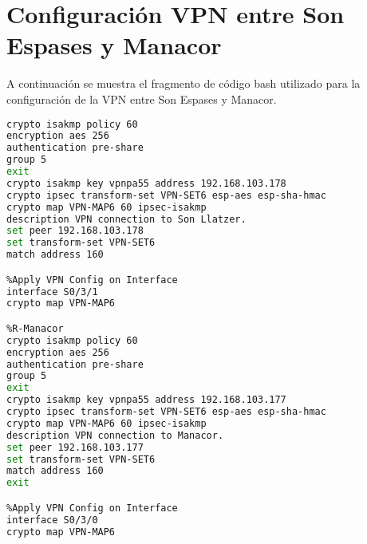 \section{Configuración VPN entre Son Espases y Manacor}\label{anexo:vpn}
A continuación se muestra el fragmento de código bash utilizado para la configuración de la VPN entre Son Espases y Manacor.

\begin{lstlisting}[language=Bash, caption={Configuración VPN entre Son Espases y Manacor}]
%R-Son_Espases
crypto isakmp policy 60
encryption aes 256
authentication pre-share
group 5
exit
crypto isakmp key vpnpa55 address 192.168.103.178
crypto ipsec transform-set VPN-SET6 esp-aes esp-sha-hmac
crypto map VPN-MAP6 60 ipsec-isakmp
description VPN connection to Son Llatzer.
set peer 192.168.103.178
set transform-set VPN-SET6
match address 160

%Apply VPN Config on Interface
interface S0/3/1
crypto map VPN-MAP6

%R-Manacor
crypto isakmp policy 60
encryption aes 256
authentication pre-share
group 5
exit
crypto isakmp key vpnpa55 address 192.168.103.177
crypto ipsec transform-set VPN-SET6 esp-aes esp-sha-hmac
crypto map VPN-MAP6 60 ipsec-isakmp
description VPN connection to Manacor.
set peer 192.168.103.177
set transform-set VPN-SET6
match address 160
exit

%Apply VPN Config on Interface
interface S0/3/0
crypto map VPN-MAP6
\end{lstlisting}
